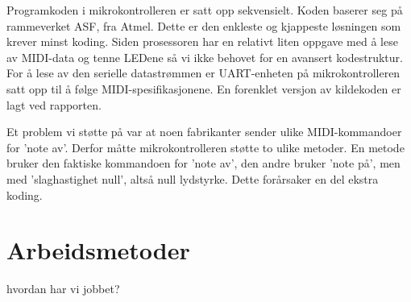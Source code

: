 Programkoden i mikrokontrolleren er satt opp sekvensielt. Koden baserer seg på rammeverket ASF, fra Atmel. Dette er den enkleste og kjappeste løsningen som krever minst koding. Siden prosessoren har en relativt liten oppgave med å lese av MIDI-data og tenne LEDene så vi ikke behovet for en avansert kodestruktur. For å lese av den serielle datastrømmen er UART-enheten på mikrokontrolleren satt opp til å følge MIDI-spesifikasjonene. En forenklet versjon av kildekoden er lagt ved rapporten.

Et problem vi støtte på var at noen fabrikanter sender ulike MIDI-kommandoer for 'note av'. Derfor måtte mikrokontrolleren støtte to ulike metoder. En metode bruker den faktiske kommandoen for 'note av', den andre bruker 'note på', men med 'slaghastighet null', altså null lydstyrke. Dette forårsaker en del ekstra koding.


\section{Arbeidsmetoder}
hvordan har vi jobbet?
